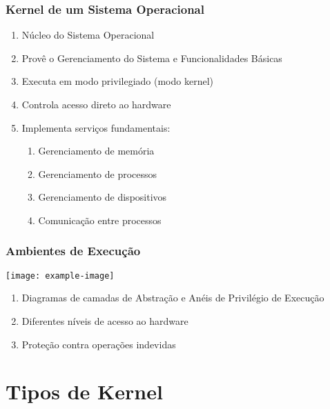 \documentclass{beamer}
\begin{document}
\begin{frame}[fragile]
\frametitle{Kernel de um Sistema Operacional}

\begin{enumerate}
    \vfill \item Núcleo do Sistema Operacional
    \vfill \item Provê o Gerenciamento do Sistema e Funcionalidades Básicas
    \vfill \item Executa em modo privilegiado (modo kernel)
    \vfill \item Controla acesso direto ao hardware
    \vfill \item Implementa serviços fundamentais:
    \begin{enumerate}
        \item Gerenciamento de memória
        \item Gerenciamento de processos
        \item Gerenciamento de dispositivos
        \item Comunicação entre processos
    \end{enumerate}
\end{enumerate}
\end{frame}

\begin{frame}[fragile]
\frametitle{Ambientes de Execução}

\begin{center}
    \texttt{[image: example-image]}
\end{center}

\begin{enumerate}
    \item Diagramas de camadas de Abstração e Anéis de Privilégio de Execução
    \item Diferentes níveis de acesso ao hardware
    \item Proteção contra operações indevidas
\end{enumerate}
\end{frame}

\section{Tipos de Kernel}
\end{document}

